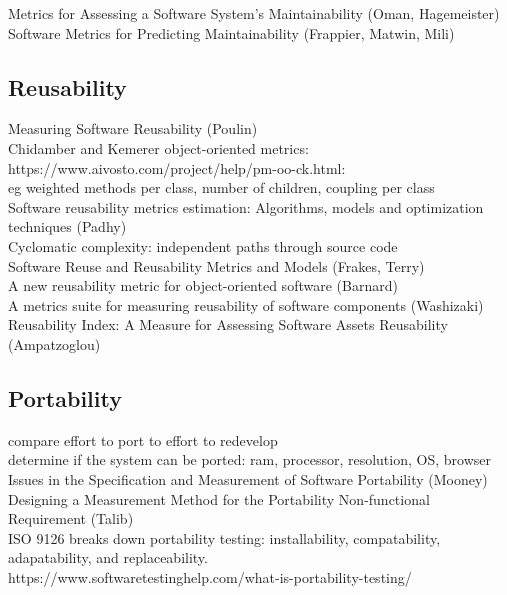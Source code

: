 \documentclass{article}
\begin{document}
Metrics for Assessing a Software System's Maintainability (Oman, Hagemeister)\\ 

Software Metrics for Predicting Maintainability (Frappier, Matwin, Mili) 
\subsection{Reusability}
Measuring Software Reusability (Poulin)\\  

Chidamber and Kemerer object-oriented metrics:\\ 

https://www.aivosto.com/project/help/pm-oo-ck.html:\\ 

eg weighted methods per class, number of children, coupling per class\\ 

Software reusability metrics estimation: Algorithms, models and optimization techniques (Padhy)\\ 

Cyclomatic complexity: independent paths through source code\\ 

Software Reuse and Reusability Metrics and Models (Frakes, Terry)\\ 

A new reusability metric for object-oriented software (Barnard)\\ 

A metrics suite for measuring reusability of software components (Washizaki)\\ 

Reusability Index: A Measure for Assessing Software Assets Reusability (Ampatzoglou) 
\subsection{Portability}
compare effort to port to effort to redevelop\\ 

determine if the system can be ported: ram, processor, resolution, OS, browser\\ 

Issues in the Specification and Measurement of Software Portability (Mooney)\\ 

Designing a Measurement Method for the Portability Non-functional Requirement (Talib)\\ 

ISO 9126 breaks down portability testing: installability, compatability, adapatability, and replaceability.\\ 

https://www.softwaretestinghelp.com/what-is-portability-testing/ 
\end{document}
